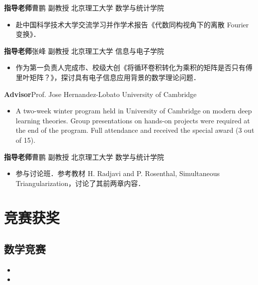 \documentclass{resume}
\begin{document}
\textbf{指导老师}\quad 曹鹏 \quad 副教授 \quad 北京理工大学 \quad 数学与统计学院
\begin{itemize}
    \item 赴中国科学技术大学交流学习并作学术报告《代数同构视角下的离散 Fourier 变换》．
\end{itemize}

\textbf{指导老师}\quad 张峰 \quad 副教授 \quad 北京理工大学 \quad 信息与电子学院
\begin{itemize}
    \item 作为第一负责人完成市、校级大创《将循环卷积转化为乘积的矩阵是否只有傅里叶矩阵？》，探讨具有电子信息应用背景的数学理论问题．
\end{itemize}

\textbf{Advisor}\quad Prof. Jose Hernandez-Lobato \quad
University of Cambridge
\begin{itemize}
    \item A two-week winter program held in University of Cambridge on modern deep learning theories. Group presentations on hands-on projects were required at the end of the program. Full attendance and received the special award (3 out of 15).
\end{itemize}

\textbf{指导老师}\quad 曹鹏 \quad 副教授 \quad 北京理工大学 \quad 数学与统计学院
\begin{itemize}
    \item 参与讨论班．参考教材 H. Radjavi and P. Rosenthal, Simultaneous Triangularization，讨论了其前两章内容．
\end{itemize}

\section{竞赛获奖}
\subsection{\textbf{数学竞赛}}

\begin{itemize}
\item{}
\item{}
\end{itemize}
\end{document}
